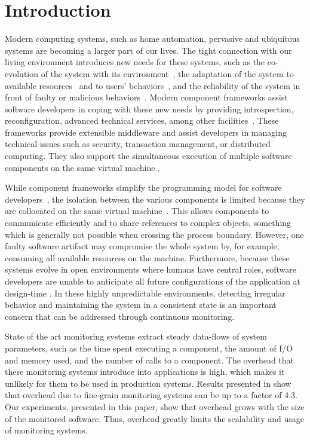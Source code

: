 \section{Introduction}\label{sec:intro}

Modern computing systems, such as home automation, pervasive and ubiquitous systems are becoming a larger part of our lives.
The tight connection with our living environment introduces new needs for these systems, such as the co-evolution of the system with its environment~\cite{rouvoy2009music}, the adaptation of the system to available resources~\cite{poladian2004dynamic} and to users' behaviors~\cite{kakousis2010survey}, and the reliability of the system in front of faulty or malicious behaviors~\cite{ghosh2007self}.
Modern component frameworks assist software developers in coping with these new needs by providing introspection, reconfiguration, advanced technical services, among other facilities~\cite{garlan2004rainbow}.
These frameworks provide extensible middleware and assist developers in managing technical issues such as security, transaction management, or distributed computing.
They also support the simultaneous execution of multiple software components on the same virtual machine \cite{OSGI:r5,Kevoree,bruneton06}.

While component frameworks simplify the programming model for software developers~\cite{heineman2001component}, the isolation between the various components is limited because they are collocated on the same virtual machine~\cite{geoffray2009jvm}.
This allows components to communicate efficiently and to share references to complex objects, something which is generally not possible when crossing the process boundary.
However, one faulty software artifact may compromise the whole system by, for example, consuming all available resources on the machine.
Furthermore, because these systems evolve in open environments where humans have central roles, software developers are unable to anticipate all future configurations of the application  at design-time \cite{baresi2006toward}.
In these highly unpredictable environments, detecting irregular behavior and maintaining the system in a consistent state is an important concern that can be addressed through continuous monitoring.

State of the art monitoring systems \cite{FrenotS04,KregerHaroldWilliamson03,Binder200645} extract steady data-flows of system parameters, such as the time spent executing a component, the amount of I/O and memory used, and the number of calls to a component.
The overhead that these monitoring systems introduce into applications is high, which makes it unlikely for them to be used in production systems.
Results presented in \cite{Binder:2009:PPV:1464245.1464249} show that overhead due to fine-grain monitoring systems can be up to a factor of 4.3.
Our experiments, presented in this paper, show that overhead grows with the size of the monitored software.
Thus, overhead greatly limits the scalability and usage of monitoring systems.

